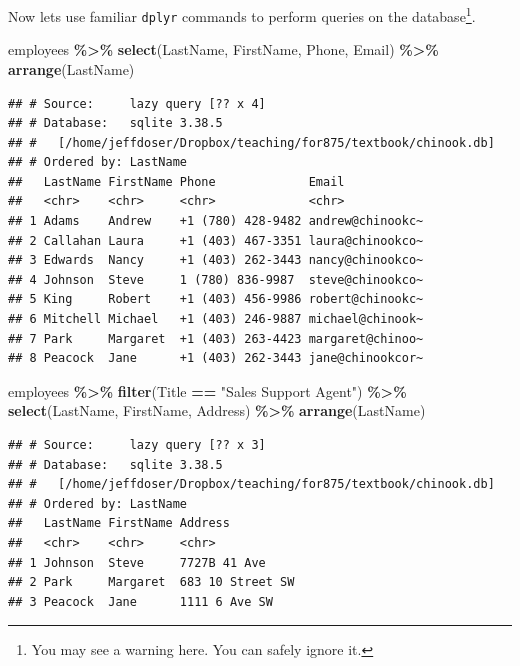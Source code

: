 \documentclass[
]{krantz}
\newenvironment{Shaded}{\begin{snugshade}}{\end{snugshade}}
\newcommand{\KeywordTok}[1]{\textcolor[rgb]{0.13,0.29,0.53}{\textbf{#1}}}
\newcommand{\NormalTok}[1]{#1}
\newcommand{\OperatorTok}[1]{\textcolor[rgb]{0.81,0.36,0.00}{\textbf{#1}}}
\newcommand{\StringTok}[1]{\textcolor[rgb]{0.31,0.60,0.02}{#1}}
\begin{document}
Now lets use familiar \texttt{dplyr} commands to perform queries on the database\footnote{You may see a warning here. You can safely ignore it.}.

\begin{Shaded}
\begin{Highlighting}[]
\NormalTok{employees }\OperatorTok{\%\textgreater{}\%}\StringTok{ }
\StringTok{  }\KeywordTok{select}\NormalTok{(LastName, FirstName, Phone, Email) }\OperatorTok{\%\textgreater{}\%}\StringTok{ }
\StringTok{  }\KeywordTok{arrange}\NormalTok{(LastName)}
\end{Highlighting}
\end{Shaded}

\begin{verbatim}
## # Source:     lazy query [?? x 4]
## # Database:   sqlite 3.38.5
## #   [/home/jeffdoser/Dropbox/teaching/for875/textbook/chinook.db]
## # Ordered by: LastName
##   LastName FirstName Phone             Email           
##   <chr>    <chr>     <chr>             <chr>           
## 1 Adams    Andrew    +1 (780) 428-9482 andrew@chinookc~
## 2 Callahan Laura     +1 (403) 467-3351 laura@chinookco~
## 3 Edwards  Nancy     +1 (403) 262-3443 nancy@chinookco~
## 4 Johnson  Steve     1 (780) 836-9987  steve@chinookco~
## 5 King     Robert    +1 (403) 456-9986 robert@chinookc~
## 6 Mitchell Michael   +1 (403) 246-9887 michael@chinook~
## 7 Park     Margaret  +1 (403) 263-4423 margaret@chinoo~
## 8 Peacock  Jane      +1 (403) 262-3443 jane@chinookcor~
\end{verbatim}

\begin{Shaded}
\begin{Highlighting}[]
\NormalTok{employees }\OperatorTok{\%\textgreater{}\%}\StringTok{ }
\StringTok{  }\KeywordTok{filter}\NormalTok{(Title }\OperatorTok{==}\StringTok{ "Sales Support Agent"}\NormalTok{) }\OperatorTok{\%\textgreater{}\%}\StringTok{ }
\StringTok{  }\KeywordTok{select}\NormalTok{(LastName, FirstName, Address) }\OperatorTok{\%\textgreater{}\%}\StringTok{ }
\StringTok{  }\KeywordTok{arrange}\NormalTok{(LastName)}
\end{Highlighting}
\end{Shaded}

\begin{verbatim}
## # Source:     lazy query [?? x 3]
## # Database:   sqlite 3.38.5
## #   [/home/jeffdoser/Dropbox/teaching/for875/textbook/chinook.db]
## # Ordered by: LastName
##   LastName FirstName Address         
##   <chr>    <chr>     <chr>           
## 1 Johnson  Steve     7727B 41 Ave    
## 2 Park     Margaret  683 10 Street SW
## 3 Peacock  Jane      1111 6 Ave SW
\end{verbatim}
\end{document}

